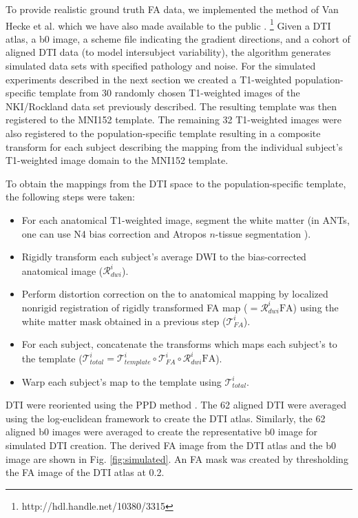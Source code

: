 \documentclass[final,5p,times,twocolumn]{elsarticle}
\begin{document}
To provide realistic ground truth FA data, we implemented 
the method of Van Hecke et al. \citep{van-hecke2009} which 
we have also made available to the public
\citep{Tustison2011}.%
\footnote{
http://hdl.handle.net/10380/3315
}  
Given a DTI atlas, a b0 image, a scheme file indicating
the gradient directions, and 
a cohort of aligned DTI data (to model intersubject variability), the
algorithm generates
simulated data sets with specified pathology and noise.
For the simulated experiments described in the next section we
created a T1-weighted population-specific template from 30 randomly chosen T1-weighted images of
the NKI/Rockland data set previously described.  
The resulting
template was then registered to the MNI152 template.  
The remaining 32 T1-weighted images were also registered to the population-specific 
template resulting in a composite transform for each subject describing
the mapping from the individual subject's T1-weighted image domain to 
the MNI152 template.  

To obtain the mappings from the DTI space to the population-specific
template, the following steps were taken:
\begin{itemize}
  \item For each anatomical T1-weighted image, segment the white matter (in ANTs, one can use N4 bias correction \citep{Tustison2010} and Atropos $n$-tissue segmentation \citep{Avants2011a}).
  \item Rigidly transform each subject's average DWI to the bias-corrected anatomical image ($\mathcal{R}^i_{dwi}$).
  \item Perform distortion correction on the {\color{red}{DTI}} to anatomical mapping 
        by localized nonrigid registration
        of rigidly transformed FA map ($=\mathcal{R}^i_{dwi} \mathrm{FA}$) using
        the white matter mask obtained in a previous step ($\mathcal{T}^i_{FA}$).
  \item For each subject, concatenate the transforms which maps each
        subject's {\color{red}{DTI}} to the template ($\mathcal{T}^i_{total} = \mathcal{T}^i_{template} \circ 
        \mathcal{T}^i_{FA} \circ \mathcal{R}^i_{dwi} \mathrm{FA}$).
  \item Warp each subject's {\color{red}{DTI}} map to the template using $\mathcal{T}^i_{total}$.  
\end{itemize}
DTI 
were reoriented using the PPD method \cite{alexander2001}.  The 62
aligned DTI were averaged using the log-euclidean framework 
\cite{arsigny2006} to create the DTI atlas.  Similarly, the 62 aligned
b0 images were averaged to create the representative b0 image
for simulated DTI creation.  The derived FA image from the DTI atlas and 
the b0 image are shown in 
Fig. \ref{fig:simulated}.  An FA mask was created by thresholding 
the FA image of the DTI atlas at 0.2.
\end{document}
